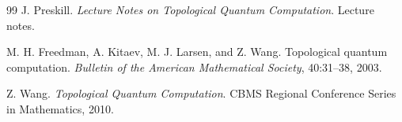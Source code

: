 \documentclass[11pt]{article}
\begin{document}
\begin{thebibliography}{99}
J. Preskill.
\newblock \emph{Lecture Notes on Topological Quantum Computation}.
\newblock Lecture notes.

M. H. Freedman, A. Kitaev, M. J. Larsen, and Z. Wang.
\newblock Topological quantum computation.
\newblock \emph{Bulletin of the American Mathematical Society}, 40:31--38, 2003.

Z. Wang.
\newblock \emph{Topological Quantum Computation}.
\newblock CBMS Regional Conference Series in Mathematics, 2010.

\end{thebibliography}
\end{document}
